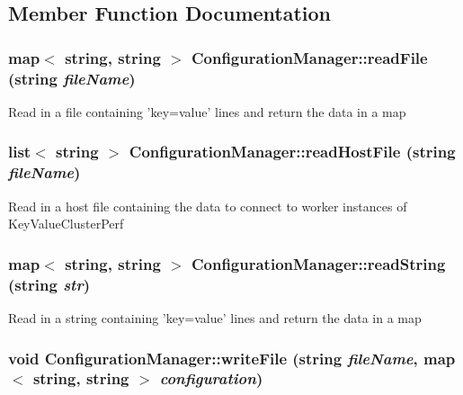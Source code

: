 \subsection{Member Function Documentation}
\hypertarget{classConfigurationManager_a1c4ee8379e2ccee2a2ac76b92042daba}{
\subsubsection[{readFile}]{\setlength{\rightskip}{0pt plus 5cm}map$<$ string, string $>$ ConfigurationManager::readFile (string {\em fileName})}}
\label{classConfigurationManager_a1c4ee8379e2ccee2a2ac76b92042daba}
Read in a file containing 'key=value' lines and return the data in a map \hypertarget{classConfigurationManager_adba6ce19eaf7b98ba158011f4bb71eea}{
\subsubsection[{readHostFile}]{\setlength{\rightskip}{0pt plus 5cm}list$<$ string $>$ ConfigurationManager::readHostFile (string {\em fileName})}}
\label{classConfigurationManager_adba6ce19eaf7b98ba158011f4bb71eea}
Read in a host file containing the data to connect to worker instances of KeyValueClusterPerf \hypertarget{classConfigurationManager_aed48081116dc9181acb904ac18a52eb5}{
\subsubsection[{readString}]{\setlength{\rightskip}{0pt plus 5cm}map$<$ string, string $>$ ConfigurationManager::readString (string {\em str})}}
\label{classConfigurationManager_aed48081116dc9181acb904ac18a52eb5}
Read in a string containing 'key=value' lines and return the data in a map \hypertarget{classConfigurationManager_a078649c42cbc46e6fbdf7b7a74183898}{
\subsubsection[{writeFile}]{\setlength{\rightskip}{0pt plus 5cm}void ConfigurationManager::writeFile (string {\em fileName}, \/  map$<$ string, string $>$ {\em configuration})}}

